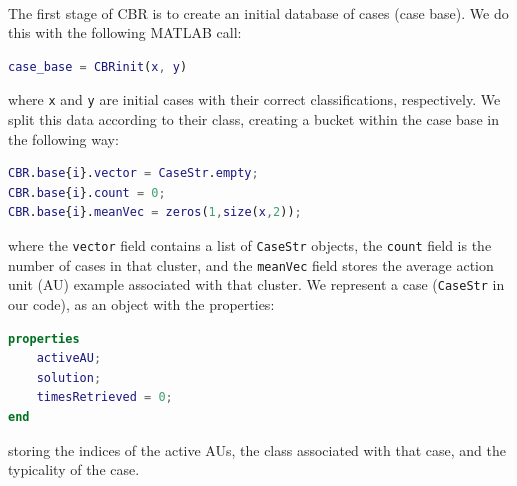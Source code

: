 \documentclass[a4paper,12pt,oneside,final]{report}
\newenvironment{changemargin}[2]{\begin{list}{}{%
\setlength{\topsep}{0pt}%
\setlength{\leftmargin}{0pt}%
\setlength{\rightmargin}{0pt}%
\setlength{\listparindent}{\parindent}%
\setlength{\itemindent}{\parindent}%
\setlength{\parsep}{0pt plus 1pt}%
\addtolength{\leftmargin}{#1}%
\addtolength{\rightmargin}{#2}%
}\item }{\end{list}}
\begin{document}
\paragraph{}
The first stage of CBR is to create an initial database of cases (case base).  We do this with the following MATLAB call:
\begin{changemargin}{-5mm}{-5mm}
\begin{lstlisting}[language=Matlab, frame=single]
case_base = CBRinit(x, y)
\end{lstlisting}
\end{changemargin}
where \verb+x+ and \verb+y+ are initial cases with their correct classifications, respectively.  We split this data according to their class, creating a bucket within the case base in the following way:
\begin{changemargin}{-5mm}{-5mm}
\begin{lstlisting}[language=Matlab, frame=single]
CBR.base{i}.vector = CaseStr.empty;
CBR.base{i}.count = 0;
CBR.base{i}.meanVec = zeros(1,size(x,2));
\end{lstlisting}
\end{changemargin}
where the \verb+vector+ field contains a list of \verb+CaseStr+ objects, the \verb+count+ field is the number of cases in that cluster, and the \verb+meanVec+ field stores the average action unit (AU) example associated with that cluster.  
We represent a case (\verb+CaseStr+ in our code), as an object with the properties:
\begin{changemargin}{-5mm}{-5mm}
\begin{lstlisting}[language=Matlab, frame=single]
properties
    activeAU;
    solution;
    timesRetrieved = 0;
end
\end{lstlisting}
\end{changemargin}
storing the indices of the active AUs, the class associated with that case, and the typicality of the case.
\end{document}
